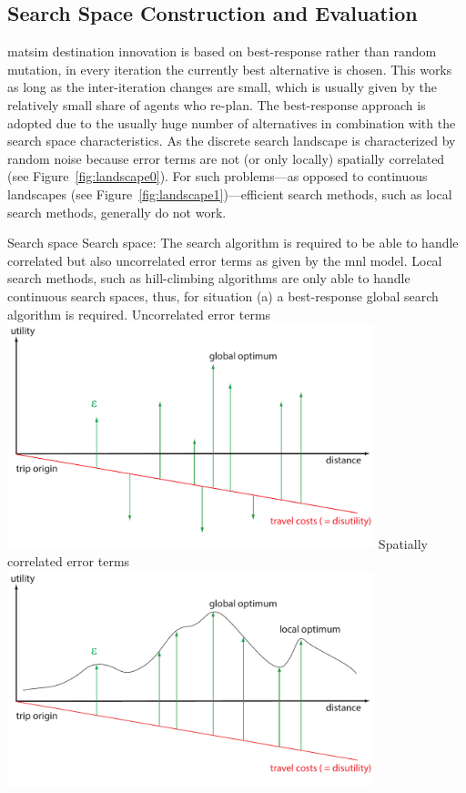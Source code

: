 \subsection{Search Space Construction and Evaluation}
\gls{matsim} destination innovation is based on best-response rather than random mutation, \ie in every iteration the currently best alternative is chosen. 
This works as long as the inter-iteration changes are small, which is usually given by the relatively small share of agents who re-plan. 
The best-response approach is adopted due to the usually huge number of alternatives in combination with the search space characteristics. 
As the discrete search landscape is characterized by random noise because error terms are not (or only locally) spatially correlated (see Figure~\ref{fig:landscape0}). For such problems---as opposed to continuous landscapes (see Figure~\ref{fig:landscape1})---efficient search methods, such as local search methods, generally do not work.

\createfigure%
{Search space}%
{Search space: The search algorithm is required to be able to handle correlated but also uncorrelated error terms as given by the \gls{mnl} model. Local search methods, such as hill-climbing algorithms are only able to handle continuous search spaces, thus, for situation (a) a best-response global search algorithm is required.}%
{\label{fig:landscape}}%
{%
  \createsubfigure%
  {Uncorrelated error terms}%
  {\includegraphics[width=0.8\textwidth,angle=0]{extending/figures/dc/landscape1.pdf}}%
  {\label{fig:landscape0}}%
  {}%
  \createsubfigure%
  {Spatially correlated error terms}%
	{\includegraphics[width=0.8\textwidth,angle=0]{extending/figures/dc/landscape0.pdf}}%
  {\label{fig:landscape1}}%
  {}%
}%
{}

